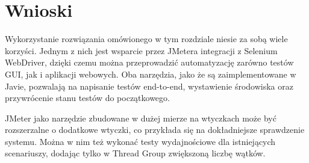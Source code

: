 \newpage

\section{Wnioski}
Wykorzystanie rozwiązania omówionego w tym rozdziale niesie za sobą wiele korzyści. Jednym z nich jest wsparcie przez JMetera integracji z Selenium WebDriver, dzięki czemu można przeprowadzić automatyzację zarówno testów GUI, jak i aplikacji webowych. Oba narzędzia, jako że są zaimplementowane w Javie, pozwalają na napisanie testów end-to-end, wystawienie środowiska oraz przywrócenie stanu testów do początkowego.


JMeter jako narzędzie zbudowane w dużej mierze na wtyczkach może być rozszerzalne o dodatkowe wtyczki, co przykłada się na dokładniejsze sprawdzenie systemu. Można w nim też wykonać testy wydajnościowe dla istniejących scenariuszy, dodając tylko w Thread Group zwiększoną liczbę wątków.



